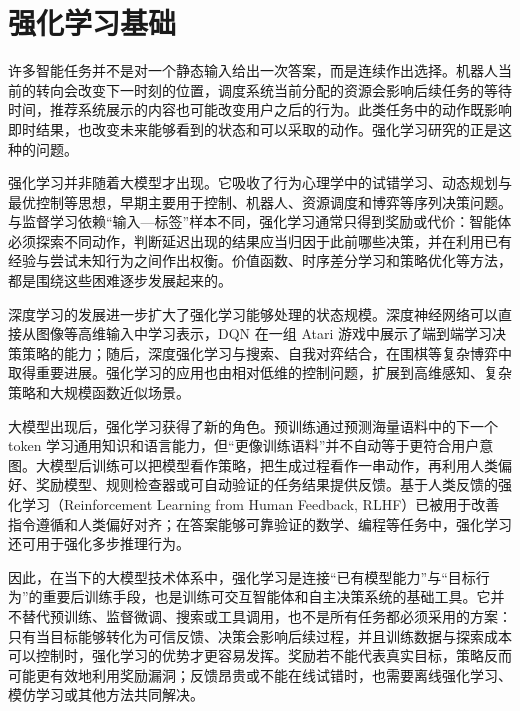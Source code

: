 
\chapter{强化学习基础}

许多智能任务并不是对一个静态输入给出一次答案，而是连续作出选择。机器人当前的转向会改变下一时刻的位置，调度系统当前分配的资源会影响后续任务的等待时间，推荐系统展示的内容也可能改变用户之后的行为。此类任务中的动作既影响即时结果，也改变未来能够看到的状态和可以采取的动作。强化学习研究的正是这种的问题。

强化学习并非随着大模型才出现。它吸收了行为心理学中的试错学习、动态规划与最优控制等思想，早期主要用于控制、机器人、资源调度和博弈等序列决策问题。与监督学习依赖“输入—标签”样本不同，强化学习通常只得到奖励或代价：智能体必须探索不同动作，判断延迟出现的结果应当归因于此前哪些决策，并在利用已有经验与尝试未知行为之间作出权衡。价值函数、时序差分学习和策略优化等方法，都是围绕这些困难逐步发展起来的。

深度学习的发展进一步扩大了强化学习能够处理的状态规模。深度神经网络可以直接从图像等高维输入中学习表示，DQN 在一组 Atari 游戏中展示了端到端学习决策策略的能力；随后，深度强化学习与搜索、自我对弈结合，在围棋等复杂博弈中取得重要进展。强化学习的应用也由相对低维的控制问题，扩展到高维感知、复杂策略和大规模函数近似场景。

大模型出现后，强化学习获得了新的角色。预训练通过预测海量语料中的下一个 token 学习通用知识和语言能力，但“更像训练语料”并不自动等于更符合用户意图。大模型后训练可以把模型看作策略，把生成过程看作一串动作，再利用人类偏好、奖励模型、规则检查器或可自动验证的任务结果提供反馈。基于人类反馈的强化学习（Reinforcement Learning from Human Feedback, RLHF）已被用于改善指令遵循和人类偏好对齐；在答案能够可靠验证的数学、编程等任务中，强化学习还可用于强化多步推理行为。

因此，在当下的大模型技术体系中，强化学习是连接“已有模型能力”与“目标行为”的重要后训练手段，也是训练可交互智能体和自主决策系统的基础工具。它并不替代预训练、监督微调、搜索或工具调用，也不是所有任务都必须采用的方案：只有当目标能够转化为可信反馈、决策会影响后续过程，并且训练数据与探索成本可以控制时，强化学习的优势才更容易发挥。奖励若不能代表真实目标，策略反而可能更有效地利用奖励漏洞；反馈昂贵或不能在线试错时，也需要离线强化学习、模仿学习或其他方法共同解决。

